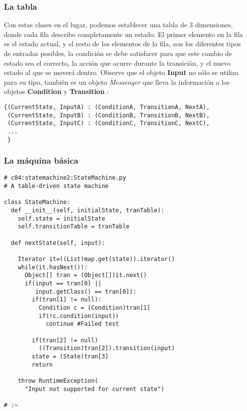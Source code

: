 \subsubsection*{La tabla}
\label{subsubsec:lt}

Con estas clases en el lugar, podemos establecer una tabla de 3 dimensiones, donde cada fila describe completamente un estado. El primer elemento en la fila es el estado actual, y el resto de los elementos de la fila, son los diferentes tipos de entradas posibles, la condición se debe satisfacer para que este cambio de estado sea el correcto, la acción que ocurre durante la transición, y el nuevo estado al que se moverá dentro. Observe que el objeto \textbf{Input} no sólo se utiliza para su tipo, también es un objeto \textit{Messenger} que lleva la información a los objetos \textbf{Condition} y \textbf{ Transition} :     \newline

\begin{lstlisting}
{(CurrentState, InputA) : (ConditionA, TransitionA, NextA), 
 (CurrentState, InputB) : (ConditionB, TransitionB, NextB), 
 (CurrentState, InputC) : (ConditionC, TransitionC, NextC), 
 ... 
 }
\end{lstlisting}


\subsubsection*{La máquina básica}
\label{subsubsec:lmb}

\begin{lstlisting}
# c04:statemachine2:StateMachine.py 
# A table-driven state machine 

class StateMachine: 
  def __init__(self, initialState, tranTable): 
    self.state = initialState 
    self.transitionTable = tranTable 
    
  def nextState(self, input): 
  
    Iterator it=((List)map.get(state)).iterator() 
    while(it.hasNext()): 
      Object[] tran = (Object[])it.next() 
      if(input == tran[0] ||  
         input.getClass() == tran[0]): 
        if(tran[1] != null): 
          Condition c = (Condition)tran[1] 
          if(!c.condition(input)) 
            continue #Failed test
            
        if(tran[2] != null) 
          ((Transition)tran[2]).transition(input) 
        state = (State)tran[3] 
        return 
        
    throw RuntimeException( 
      "Input not supported for current state") 
      
# :~ 
\end{lstlisting}

